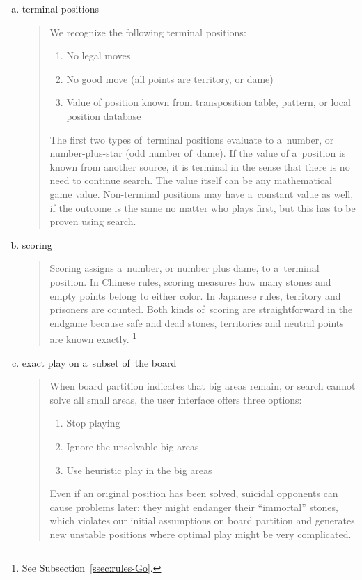 \begin{enumerate}[(a)]
  \item terminal positions
    \begin{quotation}
      \noindent
      We recognize the following terminal positions:
      \begin{enumerate}[$\diamondsuit$]
        \item No legal moves
        \item No good move (all points are territory, or dame)
        \item Value of position known from transposition table, pattern, or local position database
      \end{enumerate}
      The first two types of~terminal positions evaluate to a~number, or number-plus-star (odd
      number of~dame).
      If the value of a~position is known from another source, it is terminal in the sense that there is no need to continue search.
      The value itself can be any mathematical game value.
      Non-terminal positions may have a~constant value as well, if the outcome is the same no matter who plays first, but this has to be proven using search.
    \end{quotation}

  \item scoring
    \begin{quotation}
      Scoring assigns a~number, or number plus dame, to a~terminal position.
      In Chinese rules, scoring measures how many stones and empty points belong to either color.
      In Japanese rules, territory and prisoners are counted.
      Both kinds of~scoring are straightforward in the endgame because safe and dead stones, territories and neutral points are known exactly.%
      \footnote{See Subsection~\ref{ssec:rules-Go}.}
    \end{quotation}

  \item exact play on a~subset of~the board
    \begin{quotation}
      When board partition indicates that big areas remain, or search cannot solve all small areas, the user interface offers three options:
      \begin{enumerate}[$\diamondsuit$]
        \item Stop playing
        \item Ignore the unsolvable big areas
        \item Use heuristic play in the big areas
      \end{enumerate}
      Even if an original position has been solved, suicidal opponents can cause problems later:
      they might endanger their ``immortal'' stones, which violates our initial assumptions on board partition and generates new unstable positions where optimal play might be very complicated.
    \end{quotation}


\end{enumerate}
